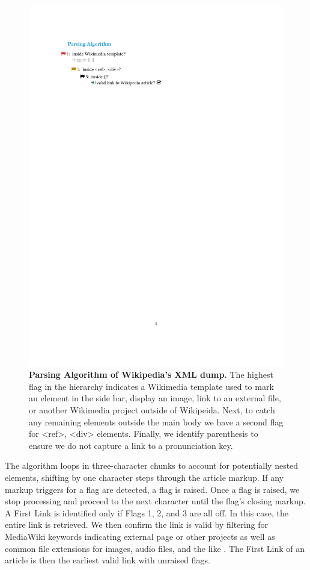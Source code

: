 \documentclass[pre,twocolumn,twoside,superscriptaddress,floatfix, aps, 10pt]{revtex4-1}
\begin{document}
\begin{figure}[tp!]
  \centering	
  \includegraphics[width=\columnwidth]{graphics/flags.pdf}  
  \caption{
    \textbf{Parsing Algorithm of Wikipedia's XML dump.}
     The highest flag in the hierarchy indicates a Wikimedia template used to mark an element in the side bar, display an image, link to an external file, or another Wikimedia project outside of Wikipeida. Next, to catch any remaining elements outside the main body we have a second flag for <ref>, <div> elements. Finally, we identify parenthesis to ensure we do not capture a link to a pronunciation key.
  }
  \label{fig:parsing algorithm}
\end{figure}

The algorithm loops in three-character chunks to account for potentially nested elements, 
shifting by one character steps through the article markup.
If any markup triggers for a flag are detected, a flag is raised. 
Once a flag is raised, we stop processing and proceed to the next character
until the flag's closing markup.
A First Link is identified only if Flags 1, 2, and 3 are all off.
In this case, the entire link is retrieved. 
We then confirm the link is valid by filtering for MediaWiki keywords indicating external page or other projects
as well as common file extensions for 
images, audio files, and the like 
\cite{media_wiki_templates}.
The First Link of an article is then the earliest valid link with unraised flags.
\end{document}
